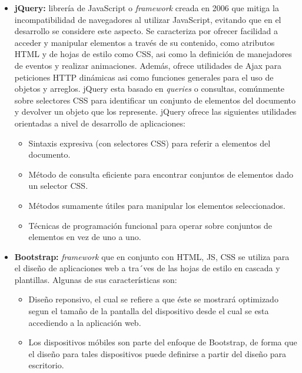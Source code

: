 \begin{itemize}
        
    \item \textbf{jQuery:} librería de JavaScript o \textit{framework} creada en 2006 que mitiga la incompatibilidad de navegadores al utilizar JavaScript, evitando que en el desarrollo se considere este aspecto. Se caracteriza por ofrecer facilidad a acceder y manipular elementos a través de su contenido, como atributos  HTML y de hojas de estilo como CSS, asi como la definición de manejadores de eventos y realizar animaciones. Además, ofrece utilidades de Ajax para peticiones HTTP dinámicas asi como funciones generales para el uso de objetos y arreglos. jQuery esta basado en \textit{queries} o consultas, comúnmente sobre selectores CSS para identificar un conjunto de elementos del documento y devolver un objeto que los represente. jQuery ofrece las siguientes utilidades orientadas a nivel de desarrollo de aplicaciones:
        \begin{itemize}
            \item Sintaxis expresiva (con selectores CSS) para referir a elementos del documento.
            \item Método de consulta eficiente para encontrar conjuntos de elementos dado un selector CSS.
            \item Métodos sumamente útiles para manipular los elementos seleccionados.
            \item Técnicas de programación funcional para operar sobre conjuntos de elementos en vez de uno a uno.
        \end{itemize}
        
    \item \textbf{Bootstrap:} \textit{framework} que en conjunto con HTML, JS, CSS se utiliza para el diseño de aplicaciones web a tra´ves de las hojas de estilo en cascada y plantillas. Algunas de sus características son:
        \begin{itemize}
            \item Diseño reponsivo, el cual se refiere a que éste se mostrará optimizado segun el tamaño de la pantalla del dispositivo desde el cual se esta accediendo a la aplicación web.
            \item Los dispositivos móbiles son parte del enfoque de Bootstrap, de forma que el diseño para tales dispositivos puede definirse a partir del diseño para escritorio.
        \end{itemize}
        
        
        

\end{itemize}
